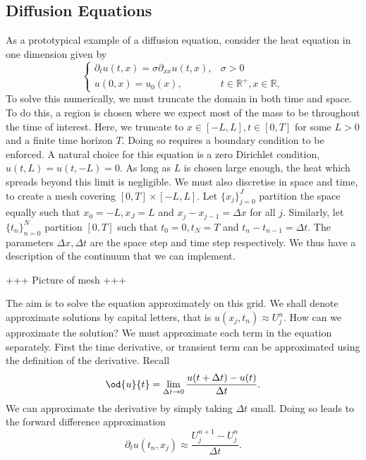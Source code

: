 \documentclass[11pt, a4paper, draft]{article}
\renewcommand{\R}{\mathbb{R}}
\newcommand{\Dt}{\Delta t}
\begin{document}
        \subsection{Diffusion Equations}
        As a prototypical example of a diffusion equation, consider the heat equation in one dimension given by 
        \begin{equation}\begin{cases}
        \partial_t u(t,x) = \sigma\partial_{xx} u(t,x),&\sigma >0\\
        u(0,x) = u_0(x),  &t\in\R^+, x\in\R,
        \end{cases}\label{eq:heat}\end{equation}
        To solve this numerically, we must truncate the domain in both time and space. To do this, a region is chosen where we expect most of the mass to be throughout the time of interest. Here, we truncate to \(x \in [-L,L], t \in [0,T]\) for some \(L>0\) and a finite time horizon \(T\). Doing so requires a boundary condition to be enforced. A natural choice for this equation is a zero Dirichlet condition, \(u(t,L) = u(t,-L) = 0\). As long as \(L\) is chosen large enough, the heat which spreads beyond this limit is negligible. We must also discretise in space and time, to create a mesh covering \(\left[0,T\right] \times \left[-L,L\right]\). Let \(\lbrace x_j\rbrace_{j=0}^J\) partition the space equally such that \(x_0 = -L, x_J=L\) and \(x_j-x_{j-1} = \Delta x\) for all \(j\). Similarly, let \(\lbrace t_n\rbrace_{n=0}^N\) partition \(\left[0,T\right]\) such that \(t_0=0, t_N =T\) and \(t_n-t_{n-1} = \Delta t\). The parameters \(\Delta x, \Delta t\) are the space step and time step respectively. We thus have a description of the continuum that we can implement. 
        
        +++ Picture of mesh +++
        
        The aim is to solve the equation approximately on this grid. We shall denote approximate solutions by capital letters, that is \(u(x_j,t_n) \approx U_j^n\). How can we approximate the solution? We must approximate each term in the equation separately. First the time derivative, or transient term can be approximated using the definition of the derivative. Recall
        \[
        \od{u}{t} = \lim_{\Delta t \to 0}\frac{u(t+\Dt) - u(t)}{\Dt}.
        \]
        We can approximate the derivative by simply taking \(\Dt\) small. Doing so leads to the forward difference approximation
        \[
        \partial_t u(t_n,x_j) \approx \frac{U^{n+1}_j- U^n_j}{\Dt}.
        \]
        
\end{document}

